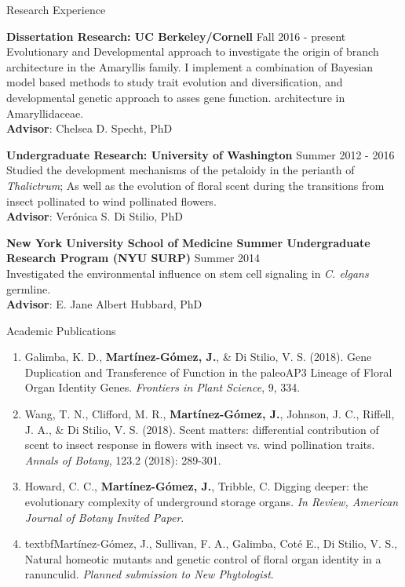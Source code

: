 \documentclass{resume} %
\begin{document}
\begin{rSection}{Research Experience}

\textbf{Dissertation Research: UC Berkeley/Cornell} \hfill	Fall 2016 - present \\
Evolutionary and Developmental approach to investigate the origin of branch architecture in the Amaryllis family. I implement a combination of Bayesian model based methods to study trait evolution and diversification, and developmental genetic approach to asses gene function.  
architecture in Amaryllidaceae. \\
\textbf{Advisor}: Chelsea D. Specht, PhD

\textbf{Undergraduate Research: University of Washington} \hfill	Summer 2012 - 2016\\
Studied the development mechanisms of the petaloidy in the perianth of \textit{Thalictrum};
As well as the evolution of floral scent during the transitions from insect pollinated to wind pollinated flowers.  \\
\textbf{Advisor}: Verónica S. Di Stilio, PhD

\textbf{New York University School of Medicine Summer Undergraduate Research Program (NYU SURP)} \hfill	Summer 2014 \\
Investigated the environmental influence on stem cell signaling in \textit{C. elgans}
germline. \\
\textbf{Advisor}: E. Jane Albert Hubbard, PhD

\end{rSection}
\begin{rSection}{Academic Publications}

\begin{enumerate}[leftmargin=0cm]
\item Galimba, K. D., \textbf{Mart\'{i}nez-G\'{o}mez, J.}, \& Di Stilio, V. S. (2018). Gene Duplication and Transference of Function in the paleoAP3 Lineage of Floral Organ Identity Genes. \textit{Frontiers in Plant Science}, 9, 334. 

\item Wang, T. N., Clifford, M. R., \textbf{Mart\'{i}nez-G\'{o}mez, J.}, Johnson, J. C., Riffell, J. A., \& Di Stilio, V. S. (2018). Scent matters: differential contribution of scent to insect response in flowers with insect vs. wind pollination traits. \textit{Annals of Botany}, 123.2 (2018): 289-301.

\item Howard, C. C., \textbf{Mart\'{i}nez-G\'{o}mez, J.}, Tribble, C. Digging deeper: the evolutionary complexity of underground storage organs. \textit{In Review, American Journal of Botany  Invited Paper}.

\item textbf{Mart\'{i}nez-G\'{o}mez, J.}, Sullivan, F. A., Galimba, Cot\'{e} E., Di Stilio, V. S., Natural homeotic mutants and genetic control of floral organ identity in a ranunculid. \textit{Planned submission to New Phytologist}.

\end{enumerate}

\end{rSection}
\end{document}
